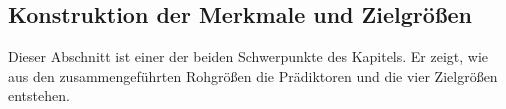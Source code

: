 \documentclass[12pt,a4paper]{article}
\begin{document}

\subsection{Konstruktion der Merkmale und Zielgrößen}
\label{sec:merkmale}

Dieser Abschnitt ist einer der beiden Schwerpunkte des Kapitels. Er zeigt, wie
aus den zusammengeführten Rohgrößen die Prädiktoren und die vier Zielgrößen
entstehen.
\end{document}
